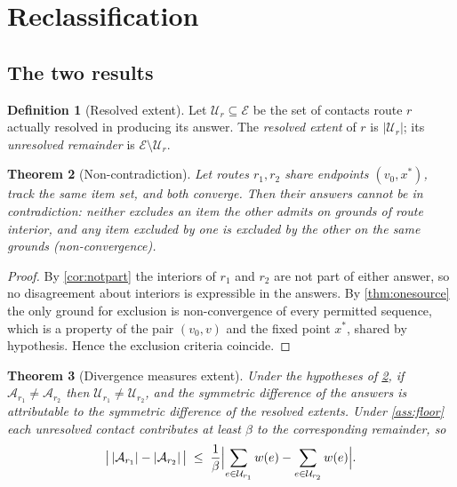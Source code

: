 \documentclass[11pt,a4paper]{article}
\theoremstyle{plain}
\newtheorem{theorem}{Theorem}[section]
\theoremstyle{definition}
\newtheorem{definition}[theorem]{Definition}
\theoremstyle{remark}
\newcommand{\Adm}{\mathcal{A}}
\newcommand{\Uset}{\mathcal{U}}
\begin{document}
\section{Reclassification}
\label{sec:reclassification}

\subsection{The two results}

\begin{definition}[Resolved extent]
\label{def:extent}
Let $\Uset_r \subseteq \mathcal{E}$ be the set of contacts route $r$ actually
resolved in producing its answer. The \emph{resolved extent} of $r$ is
$|\Uset_r|$; its \emph{unresolved remainder} is
$\mathcal{E}\setminus\Uset_r$.
\end{definition}

\begin{theorem}[Non-contradiction]
\label{thm:noncontradiction}
Let routes $r_1, r_2$ share endpoints $(v_0,x^\ast)$, track the same item set,
and both converge. Then their answers cannot be in contradiction: neither
excludes an item the other admits on grounds of route interior, and any item
excluded by one is excluded by the other on the same grounds
\textup{(}non-convergence\textup{)}.
\end{theorem}

\begin{proof}
By \cref{cor:notpart} the interiors of $r_1$ and $r_2$ are not part of either
answer, so no disagreement about interiors is expressible in the answers. By
\cref{thm:onesource} the only ground for exclusion is non-convergence of every
permitted sequence, which is a property of the pair $(v_0,v)$ and the fixed
point $x^\ast$, shared by hypothesis. Hence the exclusion criteria coincide.
\end{proof}

\begin{theorem}[Divergence measures extent]
\label{thm:extent}
Under the hypotheses of \cref{thm:noncontradiction}, if
$\Adm_{r_1}\ne\Adm_{r_2}$ then $\Uset_{r_1}\ne\Uset_{r_2}$, and the symmetric
difference of the answers is attributable to the symmetric difference of the
resolved extents. Under \cref{ass:floor} each unresolved contact contributes at
least $\beta$ to the corresponding remainder, so
\begin{equation}
\bigl|\,|\Adm_{r_1}| - |\Adm_{r_2}|\,\bigr| \;\le\;
\frac{1}{\beta}\Bigl| \sum_{e\in\Uset_{r_1}} w(e) - \sum_{e\in\Uset_{r_2}} w(e)\Bigr| .
\label{eq:extentbound}
\end{equation}
\end{theorem}
\end{document}
